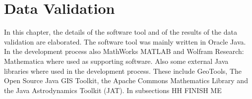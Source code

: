 \chapter{Data Validation}
\label{chap:DataValidation}

In this chapter, the details of the software tool and of the results of the data validation are elaborated. The software tool was mainly written in Oracle Java. In the development process also MathWorks MATLAB and Wolfram Research: Mathematica where used as supporting software. Also some external Java libraries where used in the development process. These include GeoTools, The Open Source Java GIS Toolkit, the Apache Commons Mathematics Library and the Java Astrodynamics Toolkit (JAT). In subsections HH FINISH ME
